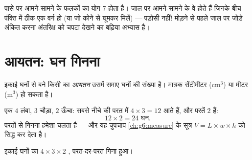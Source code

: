 \begin{example}[जाल पढ़ना]\label{ex:g5:solids:read}
पासे पर आमने-सामने के फलकों का योग $7$ होता है। जाल पर
आमने-सामने के  वे होते हैं जिनके बीच पंक्ति में ठीक एक वर्ग
हो (या जो कोने से घूमकर मिलें) --- पड़ोसी नहीं! मोड़ने से पहले
जाल पर जोड़े अंकित करना अंतरिक्ष को चपटा देखने का बढ़िया अभ्यास है।
\end{example}

\section{आयतन: घन गिनना}

\begin{definition}\label{def:g5:solids:volume}
इकाई घनों से बने किसी  का \emph{आयतन} उसमें समाए
घनों की संख्या है। मात्रक सेंटीमीटर  (cm$^3$) या मीटर 
(m$^3$) हो सकता है।
\end{definition}

\begin{example}\label{ex:g5:solids:layers}
एक  $4$  लंबा, $3$ चौड़ा, $2$ ऊँचा: सबसे नीचे की परत में
$4 \times 3 = 12$  आते हैं, और परतें $2$ हैं:
\[
12 \times 2 = 24 \text{ घन} .
\]
परतों से गिनना हमेशा चलता है --- और यह चुपचाप
\cref{ch:g6:measure} के सूत्र $V = L \times w \times h$ को सिद्ध कर देता है।
\end{example}

\begin{omfigure}

{\small इकाई घनों का $4 \times 3 \times 2$ , परत-दर-परत
गिना हुआ।}
\end{omfigure}


